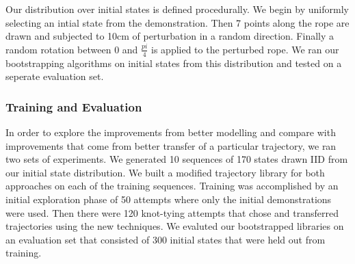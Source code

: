 Our distribution over initial states is defined procedurally. We begin by uniformly
selecting an intial state from the demonstration. Then 7 points along the rope are 
drawn and subjected to 10cm of perturbation in a random direction. Finally a random
rotation between 0 and $\frac{pi}{4}$ is applied to the perturbed rope. We ran our
bootstrapping algorithms on initial states from this distribution and tested on a 
seperate evaluation set.

\subsubsection{Training and Evaluation}
In order to explore the improvements from better modelling and compare with improvements
that come from better transfer of a particular trajectory, we ran two sets of experiments.
We generated 10 sequences of 170 states drawn IID from our initial state distribution.
We built a modified trajectory library for both approaches on each of the training sequences.
Training was accomplished by an initial exploration phase of 50 attempts where only the initial
demonstrations were used. Then there were 120 knot-tying attempts that chose and transferred
trajectories using the new techniques. We evaluted our bootstrapped libraries on an evaluation
set that consisted of 300 initial states that were held out from training.
